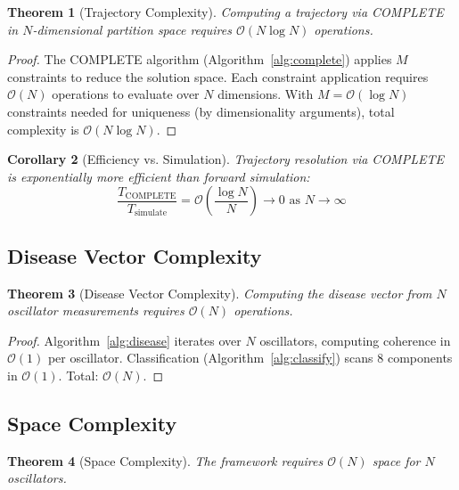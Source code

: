 \documentclass[10pt,twocolumn]{article}
\theoremstyle{plain}
\newtheorem{theorem}{Theorem}[section]
\newtheorem{corollary}[theorem]{Corollary}
\theoremstyle{definition}
\theoremstyle{remark}
\newcommand{\bigO}{\mathcal{O}}
\begin{document}
\begin{theorem}[Trajectory Complexity]
\label{thm:trajectory_complexity}
Computing a trajectory via COMPLETE in $N$-dimensional partition space requires $\bigO(N \log N)$ operations.
\end{theorem}

\begin{proof}
The COMPLETE algorithm (Algorithm~\ref{alg:complete}) applies $M$ constraints to reduce the solution space. Each constraint application requires $\bigO(N)$ operations to evaluate over $N$ dimensions. With $M = \bigO(\log N)$ constraints needed for uniqueness (by dimensionality arguments), total complexity is $\bigO(N \log N)$.
\end{proof}

\begin{corollary}[Efficiency vs. Simulation]
\label{cor:efficiency}
Trajectory resolution via COMPLETE is exponentially more efficient than forward simulation:
\begin{equation}
\frac{T_{\mathrm{COMPLETE}}}{T_{\mathrm{simulate}}} = \bigO\left(\frac{\log N}{N}\right) \to 0 \text{ as } N \to \infty
\end{equation}
\end{corollary}

\subsection{Disease Vector Complexity}

\begin{theorem}[Disease Vector Complexity]
\label{thm:disease_complexity}
Computing the disease vector from $N$ oscillator measurements requires $\bigO(N)$ operations.
\end{theorem}

\begin{proof}
Algorithm~\ref{alg:disease} iterates over $N$ oscillators, computing coherence in $\bigO(1)$ per oscillator. Classification (Algorithm~\ref{alg:classify}) scans 8 components in $\bigO(1)$. Total: $\bigO(N)$.
\end{proof}

\subsection{Space Complexity}

\begin{theorem}[Space Complexity]
\label{thm:space}
The framework requires $\bigO(N)$ space for $N$ oscillators.
\end{theorem}
\end{document}
